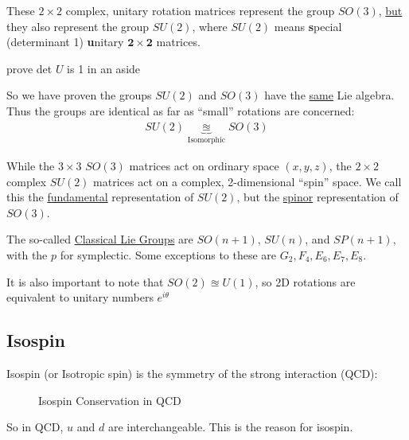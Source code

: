 These $2\times2$ complex, unitary rotation matrices represent the group $SO(3)$, \underline{but} they also represent the group $SU(2)$, where $SU(2)$ means \textbf{s}pecial (determinant 1) \textbf{u}nitary $\mathbf{2\times2}$ matrices.

\begin{TODO}
  prove det $U$ is 1 in an aside
\end{TODO}

So we have proven the groups $SU(2)$ and $SO(3)$ have the \underline{same} Lie algebra. Thus the groups are identical as far as ``small'' rotations are concerned:
\begin{align*}
  SU(2)\underbrace{\approxeq}_{\text{Isomorphic}} SO(3)
\end{align*}

While the $3\times3$ $SO(3)$ matrices act on ordinary space $(x,y,z)$, the $2\times2$ complex $SU(2)$ matrices act on a complex, 2-dimensional ``spin'' space. We call this the \underline{fundamental} representation of $SU(2)$, but the \underline{spinor} representation of $SO(3)$.
\begin{remark}
  The so-called \underline{Classical Lie Groups} are $SO(n+1)$, $SU(n)$, and $SP(n+1)$, with the $p$ for symplectic. Some exceptions to these are $G_2, F_4, E_6, E_7, E_8$.

  It is also important to note that $SO(2)\approxeq U(1)$, so 2D rotations are equivalent to unitary numbers $e^{i\theta}$
\end{remark}

\subsection{Isospin}
Isospin (or Isotropic spin) is the symmetry of the strong interaction (QCD):
\begin{figure}[H]
  \centering
  \caption{Isospin Conservation in QCD}
  \label{fig:isospin}
\end{figure}
So in QCD, $u$ and $d$ are interchangeable. This is the reason for isospin.

